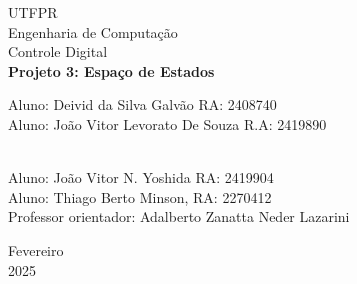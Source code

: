 \documentclass[a4paper, 12pt]{article}
\begin{document}

\begin{titlepage}
	\begin{center}
	

		\Huge{UTFPR}\\
		\large{Engenharia de Computação}\\ 
		\large{Controle Digital}\\ 
		\vspace{15pt}
        \vspace{95pt}
        \textbf{\LARGE{Projeto 3: Espaço de Estados }}\\
		\vspace{3,5cm}
	\end{center}
	
	\begin{flushleft}
		\begin{tabbing}
			  Aluno: Deivid da Silva Galvão RA: 2408740\\
                Aluno: João Vitor Levorato De Souza
R.A: 2419890

\\
                Aluno: João Vitor N. Yoshida RA: 2419904\\
                Aluno: Thiago Berto Minson, RA: 2270412\\
			Professor orientador: Adalberto Zanatta Neder Lazarini \\
	\end{tabbing}
 \end{flushleft}
	\vspace{1cm}
	
	\begin{center}
		\vspace{\fill}
			 Fevereiro\\
		 2025
			\end{center}
\end{titlepage}

\end{document}
